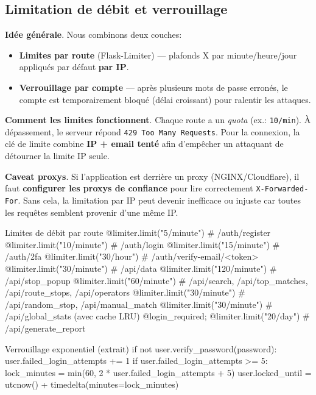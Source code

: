 \subsection*{Limitation de débit et verrouillage}
\noindent \textbf{Idée générale}. Nous combinons deux couches:
\begin{itemize}
  \item \textbf{Limites par route} (Flask-Limiter) — plafonds \og X par minute/heure/jour \fg{} appliqués par défaut \textbf{par IP}.
  \item \textbf{Verrouillage par compte} — après plusieurs mots de passe erronés, le compte est temporairement bloqué (délai croissant) pour ralentir les attaques.
\end{itemize}

\noindent \textbf{Comment les limites fonctionnent}. Chaque route a un \emph{quota} (ex.: \texttt{10/min}). À dépassement, le serveur répond \texttt{429 Too Many Requests}. Pour la connexion, la clé de limite combine \textbf{IP + email tenté} afin d'empêcher un attaquant de détourner la limite IP seule.

\noindent \textbf{Caveat proxys}. Si l'application est derrière un proxy (NGINX/Cloudflare), il faut \textbf{configurer les proxys de confiance} pour lire correctement \texttt{X-Forwarded-For}. Sans cela, la limitation \og par IP \fg{} peut devenir inefficace ou injuste car toutes les requêtes semblent provenir d'une même IP.
\begin{codebox}[language=Python]{Limites de débit par route}
@limiter.limit("5/minute")   # /auth/register
@limiter.limit("10/minute")  # /auth/login
@limiter.limit("15/minute")  # /auth/2fa
@limiter.limit("30/hour")    # /auth/verify-email/<token>
@limiter.limit("30/minute")  # /api/data
@limiter.limit("120/minute") # /api/stop_popup
@limiter.limit("60/minute")  # /api/search, /api/top_matches, /api/route_stops, /api/operators
@limiter.limit("30/minute")  # /api/random_stop, /api/manual_match
@limiter.limit("30/minute")  # /api/global_stats (avec cache LRU)
@login_required; @limiter.limit("20/day")  # /api/generate_report
\end{codebox}

\begin{codebox}[language=Python]{Verrouillage exponentiel (extrait)}
if not user.verify_password(password):
    user.failed_login_attempts += 1
    if user.failed_login_attempts >= 5:
        lock_minutes = min(60, 2 * user.failed_login_attempts + 5)
        user.locked_until = utcnow() + timedelta(minutes=lock_minutes)
\end{codebox}

